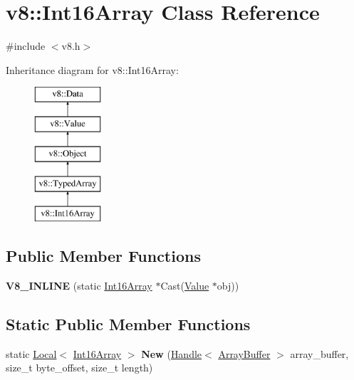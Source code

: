 \hypertarget{classv8_1_1_int16_array}{}\section{v8\+:\+:Int16\+Array Class Reference}
\label{classv8_1_1_int16_array}


{\ttfamily \#include $<$v8.\+h$>$}

Inheritance diagram for v8\+:\+:Int16\+Array\+:\begin{figure}[H]
\begin{center}
\leavevmode
\includegraphics[height=5.000000cm]{classv8_1_1_int16_array}
\end{center}
\end{figure}
\subsection*{Public Member Functions}
\begin{DoxyCompactItemize}
\item 
\hypertarget{classv8_1_1_int16_array_af68e47065b6e19f3757c5a023f2aa8f3}{}{\bfseries V8\+\_\+\+I\+N\+L\+I\+N\+E} (static \hyperlink{classv8_1_1_int16_array}{Int16\+Array} $\ast$Cast(\hyperlink{classv8_1_1_value}{Value} $\ast$obj))\label{classv8_1_1_int16_array_af68e47065b6e19f3757c5a023f2aa8f3}

\end{DoxyCompactItemize}
\subsection*{Static Public Member Functions}
\begin{DoxyCompactItemize}
\item 
\hypertarget{classv8_1_1_int16_array_adc49fddf7e0b2c719085f5f9af3762e5}{}static \hyperlink{classv8_1_1_local}{Local}$<$ \hyperlink{classv8_1_1_int16_array}{Int16\+Array} $>$ {\bfseries New} (\hyperlink{classv8_1_1_handle}{Handle}$<$ \hyperlink{classv8_1_1_array_buffer}{Array\+Buffer} $>$ array\+\_\+buffer, size\+\_\+t byte\+\_\+offset, size\+\_\+t length)\label{classv8_1_1_int16_array_adc49fddf7e0b2c719085f5f9af3762e5}

\end{DoxyCompactItemize}


